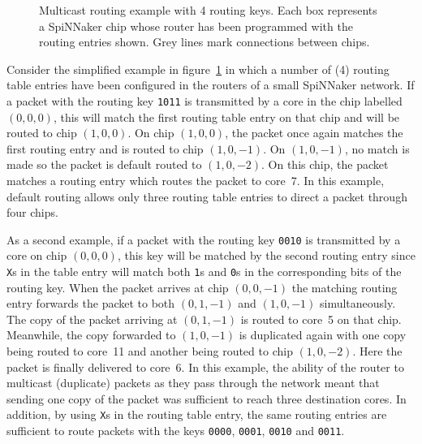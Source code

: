 			\begin{figure}
				\center
				
				\caption[Multicast routing example.]%
				{Multicast routing example with \SI{4}{\bit} routing keys. Each
				box represents a SpiNNaker chip whose router has been programmed with
				the routing entries shown. Grey lines mark connections between chips.}
				\label{fig:routing-example}
			\end{figure}
			
			Consider the simplified example in figure~\ref{fig:routing-example} in
			which a number of (\SI{4}{\bit}) routing table entries have been
			configured in the routers of a small SpiNNaker network. If a packet with
			the routing key \texttt{1011} is transmitted by a core in the chip
			labelled $(0, 0, 0)$, this will match the first routing table entry on
			that chip and will be routed to chip $(1, 0, 0)$. On chip $(1, 0, 0)$,
			the packet once again matches the first routing entry and is routed to
			chip $(1, 0, -1)$. On $(1, 0, -1)$, no match is made so the packet is
			default routed to $(1, 0, -2)$. On this chip, the packet matches a
			routing entry which routes the packet to core~7. In this example, default
			routing allows only three routing table entries to direct a packet
			through four chips.
			
			As a second example, if a packet with the routing key \texttt{0010} is
			transmitted by a core on chip $(0, 0, 0)$, this key will be matched by
			the second routing entry since \texttt{X}s in the table entry will match
			both \texttt{1}s and \texttt{0}s in the corresponding bits of the routing
			key. When the packet arrives at chip $(0, 0, -1)$ the matching routing
			entry forwards the packet to both $(0, 1, -1)$ and $(1, 0, -1)$
			simultaneously. The copy of the packet arriving at $(0, 1, -1)$ is routed
			to core~5 on that chip.  Meanwhile, the copy forwarded to $(1, 0, -1)$ is
			duplicated again with one copy being routed to core~11 and another being
			routed to chip $(1, 0, -2)$. Here the packet is finally delivered to
			core~6. In this example, the ability of the router to multicast
			(duplicate) packets as they pass through the network meant that sending
			one copy of the packet was sufficient to reach three destination cores.
			In addition, by using \texttt{X}s in the routing table entry, the same
			routing entries are sufficient to route packets with the keys
			\texttt{0000}, \texttt{0001}, \texttt{0010} and \texttt{0011}.
			
